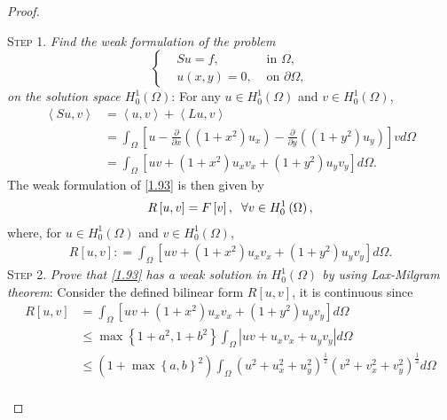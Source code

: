 \documentclass[11pt,a4paper]{article}
\numberwithin{equation}{section}
\numberwithin{equation}{section}
\begin{document}
\begin{proof}
\begin{enumerate}
\textsc{Step 1.} \textit{Find the weak formulation of the problem}
\begin{equation}
\label{1.93}
\left\{ \begin{split}
& Su = f, & \mbox{ in } \Omega ,\\
& u\left( {x,y} \right) = 0, & \mbox{ on } \partial \Omega ,
\end{split} \right.
\end{equation}
\textit{on the solution space $H_0^1\left(\Omega\right)$}: For any $u\in H_0^1\left(\Omega\right)$ and $v\in H_0^1\left(\Omega\right)$, 
\begin{align}
\left\langle {Su,v} \right\rangle  &= \left\langle {u,v} \right\rangle  + \left\langle {Lu,v} \right\rangle \\
 &= \int_\Omega  {\left[ {u - \frac{\partial }{{\partial x}}\left( {\left( {1 + {x^2}} \right){u_x}} \right) - \frac{\partial }{{\partial y}}\left( {\left( {1 + {y^2}} \right){u_y}} \right)} \right]vd\Omega } \\
& = \int_\Omega  {\left[ {uv + \left( {1 + {x^2}} \right){u_x}{v_x} + \left( {1 + {y^2}} \right){u_y}{v_y}} \right]d\Omega } .
\end{align}
The weak formulation of \eqref{1.93} is then given by
\begin{align}
R\left[ {u,v} \right] = F\left[ v \right], \hspace{0.2cm}\forall v \in H_0^1\left( \Omega  \right),
\end{align}
where, for $u\in H_0^1\left(\Omega\right)$ and $v\in H_0^1\left(\Omega\right)$,
\begin{align}
R\left[ {u,v} \right]: = \int_\Omega  {\left[ {uv + \left( {1 + {x^2}} \right){u_x}{v_x} + \left( {1 + {y^2}} \right){u_y}{v_y}} \right]d\Omega } .
\end{align}
\textsc{Step 2.} \textit{Prove that \eqref{1.93} has a weak solution in $H_0^1\left(\Omega\right)$ by using Lax-Milgram theorem}: Consider the defined bilinear form $R\left[u,v\right]$, it is continuous since
\begin{align}
R\left[ {u,v} \right] &= \int_\Omega  {\left[ {uv + \left( {1 + {x^2}} \right){u_x}{v_x} + \left( {1 + {y^2}} \right){u_y}{v_y}} \right]d\Omega } \\
& \le \max \left\{ {1 + {a^2},1 + {b^2}} \right\}\int_\Omega  {\left| {uv + {u_x}{v_x} + {u_y}{v_y}} \right|d\Omega } \\
& \le \left( {1 + \max {{\left\{ {a,b} \right\}}^2}} \right)\int_\Omega  {{{\left( {{u^2} + u_x^2 + u_y^2} \right)}^{\frac{1}{2}}}{{\left( {{v^2} + v_x^2 + v_y^2} \right)}^{\frac{1}{2}}}d\Omega } \\

\end{align}
\end{enumerate}
\end{proof}
\end{document}
